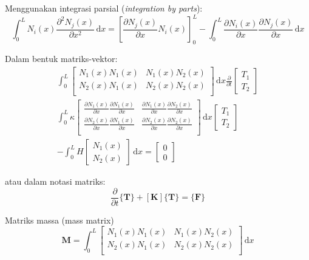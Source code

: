 Menggunakan integrasi parsial (\textit{integration by parts}):
\begin{equation*}
\int_{0}^{L} N_{i}(x) \frac{\partial^2 N_{j}(x)}{\partial x^2} \, \mathrm{d}x =
\left[ \frac{\partial N_{j}(x)}{\partial x} N_{i}(x) \right]_{0}^{L} -
\int_{0}^{L} \frac{\partial N_{i}(x)}{\partial x}
\frac{\partial N_{j}(x)}{\partial x} \, \mathrm{d}x
\end{equation*}

Dalam bentuk matriks-vektor:
\begin{align*}
\int_{0}^{L}
\begin{bmatrix}
N_{1}(x) N_{1}(x) & N_{1}(x) N_{2}(x) \\
N_{2}(x) N_{1}(x) & N_{2}(x) N_{2}(x) \\
\end{bmatrix}\, \mathrm{d}x
\frac{\partial}{\partial t}
\begin{bmatrix} T_{1} \\ T_{2} \end{bmatrix} \\
\int_{0}^{L} \kappa
\begin{bmatrix}
\frac{\partial N_{1}(x)}{\partial x} \frac{\partial N_{1}(x)}{\partial x} &
\frac{\partial N_{1}(x)}{\partial x} \frac{\partial N_{2}(x)}{\partial x} \\
\frac{\partial N_{2}(x)}{\partial x} \frac{\partial N_{1}(x)}{\partial x} &
\frac{\partial N_{2}(x)}{\partial x} \frac{\partial N_{2}(x)}{\partial x} \\
\end{bmatrix} \, \mathrm{d}x
\begin{bmatrix} T_{1} \\ T_{2} \end{bmatrix} \\
- \int_{0}^{L} H \begin{bmatrix} N_{1}(x) \\ N_{2}(x) \end{bmatrix}\, \mathrm{d}x = 
\begin{bmatrix} 0 \\ 0 \end{bmatrix}
\end{align*}

atau dalam notasi matriks:
\begin{equation}
[ \mathbf{M} ] \frac{\partial}{\partial t} \{ \mathbf{T} \} +
[ \mathbf{K} ] \{ \mathbf{T} \} = \{ \mathbf{F} \}
\end{equation}

Matriks massa (mass matrix)
\begin{equation*}
\mathbf{M} = \int_{0}^{L}
\begin{bmatrix}
N_{1}(x) N_{1}(x) & N_{1}(x) N_{2}(x) \\[0.2cm]
N_{2}(x) N_{1}(x) & N_{2}(x) N_{2}(x) \\
\end{bmatrix}\, \mathrm{d}x
\end{equation*}

